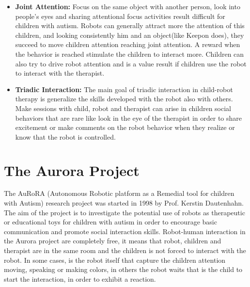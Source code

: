 \begin{itemize}
	\item \textbf{Joint Attention:} Focus on the same object with another person, look into people's eyes and sharing attentional focus activities result difficult for children with autism. Robots can generally attract more the attention of this children, and looking consistently him and an object(like Keepon does), they succeed to move children attention reaching joint attention. A reward when the behavior is reached stimulate the children to interact more. Children can also try to drive robot attention and is a value result if children use the robot to interact with the therapist.  
	
	\item \textbf{Triadic Interaction:} The main goal of triadic interaction in child-robot therapy is generalize the skills developed with the robot also with others. Make sessions with child, robot and therapist can arise in children social behaviors that are rare like look in the eye of the therapist in order to share excitement or make comments on the robot behavior when they realize or know that the robot is controlled. 
\end{itemize}




\section{The Aurora Project}
The AuRoRA (Autonomous Robotic platform as a Remedial tool for children with Autism) research
project was started in 1998 by Prof. Kerstin Dautenhahn. The aim of the project is to investigate the potential use of robots as therapeutic or educational toys for children with autism in order to encourage basic communication and promote social interaction skills\cite{robins2009isolation}.
Robot-human interaction in the Aurora project are completely free, it means that robot, children and therapist are in the same room and the children is not forced to interact with the robot. In some cases, is the robot itself that capture the children attention moving, speaking or making colors, in others the robot waits that is the child to start the interaction, in order to exhibit a reaction.

